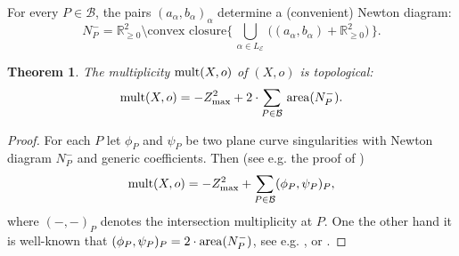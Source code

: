 \documentclass[10pt,a4paper]{amsart}
\numberwithin{equation}{section}
\numberwithin{equation}{subsection}
\theoremstyle{plain}
\newtheorem{theorem}[equation]{Theorem}
\theoremstyle{definition}
\begin{document}
For every  $P\in {\mathcal{B}}$, the pairs  $(a_\alpha,b_\alpha)_{\alpha}$
determine a (convenient) Newton diagram:
\begin{equation*}
N^-_P={\mathbb{R}}_{\geq 0}^2\setminus \mbox{convex
closure}\big\{\,\bigcup_{\alpha\in L_{\mathcal{E}}}\,
\big((a_\alpha,b_\alpha)+{\mathbb{R}}_{\geq 0}^2\big)\,\big\}.
\end{equation*}
\begin{theorem}\label{th:62} The multiplicity ${\rm mult}(X,o)$ of $(X,o)$ is
topological:
\begin{equation*}
{\rm mult}(X,o)=-Z_{{\rm max}}^2+2\cdot \sum _{P\in{\mathcal{B}}} \, {\rm
area}(N^-_P).
\end{equation*}
\end{theorem}
\begin{proof}
For each $P$ let $\phi_P$ and $\psi_P$ be two plane curve
singularities with Newton diagram $N^-_P$ and generic
coefficients. Then (see e.g. the proof of \cite[(2.7)]{Wa})
\begin{equation*}
{\rm mult}(X,o)=-Z_{{\rm max}}^2+\sum _{P\in{\mathcal{B}}}
(\phi_P,\psi_P)_P,
\end{equation*}
where $(-,-)_P$ denotes the intersection multiplicity at $P$. One
the other hand it is well-known that
 $(\phi_P,\psi_P)_P=2\cdot {\rm area}(N^-_P)$, see e.g. \cite{Tei},
or \cite[page 276]{Ploski}.
\end{proof}
\end{document}
